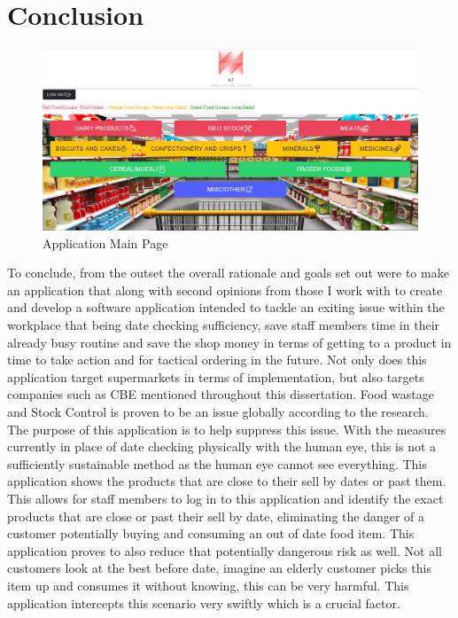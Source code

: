 \chapter{Conclusion}

\begin{figure}[h!]
	\caption{Application Main Page}
	\label{image:dashboard2}
	\centering
	\includegraphics[width=1\textwidth]{images/dashboard.PNG}
\end{figure}

To conclude, from the outset the overall rationale and goals set out were to make an application that along with second opinions from those I work with to create and develop a software application intended to tackle an exiting issue within the workplace that being date checking sufficiency, save staff members time in their already busy routine and save the shop money in terms of getting to a product in time to take action and for tactical ordering in the future. Not only does this application target supermarkets in terms of implementation, but also targets companies such as CBE mentioned throughout this dissertation. 
\newline
\newpage
Food wastage and Stock Control is proven to be an issue globally according to the research. The purpose of this application is to help suppress this issue. With the measures currently in place of date checking physically with the human eye, this is not a sufficiently sustainable method as the human eye cannot see everything. This application shows the products that are close to their sell by dates or past them. This allows for staff members to log in to this application and identify the exact products that are close or past their sell by date, eliminating the danger of a customer potentially buying and consuming an out of date food item. This application proves to also reduce that potentially dangerous risk as well. Not all customers look at the best before date, imagine an elderly customer picks this item up and consumes it without knowing, this can be very harmful. This application intercepts this scenario very swiftly which is a crucial factor. 
\newline

